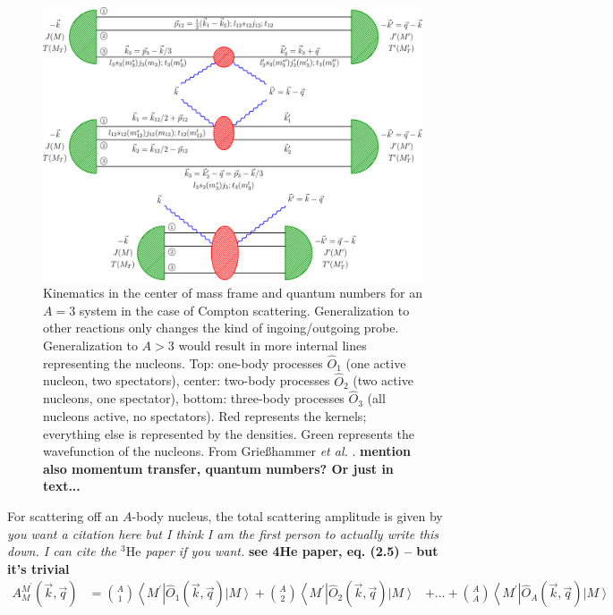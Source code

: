 \documentclass[a4paper,11pt]{article}
\newcommand{\etal}{\textit{et al.}}
\newcommand{\HeT}{{}^{3} \mathrm{He}}
\newcommand\bv[1]{\vec{#1}}
\newcommand{\ques}[1]{\color{red}\textit{ #1 }\color{black}}
\newcommand{\com}[1]{\color{blue}\small\textbf{ #1 }\color{black}\normalsize}
\begin{document}
\begin{figure}[h]
  \begin{center}
    \includegraphics[scale=0.7]{kinematics3He.pdf}
    \caption{Kinematics in the center of mass frame and quantum
      numbers for an $A=3$ system in the case of Compton scattering.
      Generalization to other reactions only changes the kind of
      ingoing/outgoing probe. Generalization to $A>3$ would result in more internal lines
      representing the nucleons.
      Top: one-body processes $\hat{O}_1$ (one active nucleon, two spectators),
      center: two-body
      processes $\hat{O}_{2}$ (two active nucleons, one spectator), bottom: three-body processes
      $\hat{O}_{3}$ (all nucleons active, no spectators). Red represents the kernels; 
      everything else is represented by the densities.
      Green represents the wavefunction of the nucleons.
      From Grie{\ss}hammer \etal
    \cite{hammer2020}.\com{mention also momentum transfer, quantum numbers? Or just in text...}}
    \label{fig:onetwobod}
  \end{center}
\end{figure}

For scattering off an $A$-body nucleus, the total scattering
amplitude is given by \ques{you want a citation here but I think I am the first person to actually write this down. I can cite the $\HeT$ paper if you want.} \com{see 4He paper, eq. (2.5) -- but it's trivial}
\begin{align}
  A_{M}^{M^{\prime} }(\bv{k}, \bv{q})&=\binom{A}{1}\left\langle
  M^{\prime}\right|\hat{O}_{1}^{}(\bv{k}, \bv{q})\left|M\right
  \rangle + \binom{A}{2} \left\langle
  M^{\prime}\right|\hat{O}_{2}^{}(\bv{k}, \bv{q}) \left|
  M\right\rangle
  &+... + \binom{A}{A}\left\langle
  M^{\prime}\right|\hat{O}_{A}^{}(\bv{k}, \bv{q})\left|M\right
  \rangle
\end{align}
\end{document}
